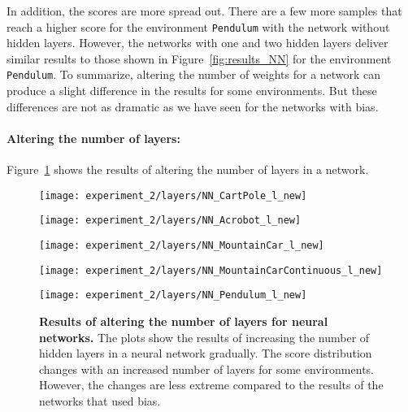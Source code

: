In addition, the scores are more spread out. There are a few more samples that reach a higher score for the environment \verb|Pendulum| with the network without hidden layers. However, the networks with one and two hidden layers deliver similar results to those shown in Figure~\ref{fig:results_NN} for the environment \verb|Pendulum|. To summarize, altering the number of weights for a network can produce a slight difference in the results for some environments. But these differences are not as dramatic as we have seen for the networks with bias.

\paragraph*{Altering the number of layers:} Figure~\ref{fig:experiment_2_layers} shows the results of altering the number of layers in a network.
\begin{figure}
  \centering
\texttt{[image: experiment\_2/layers/NN\_CartPole\_l\_new]}

  \vspace{0.2cm}

\texttt{[image: experiment\_2/layers/NN\_Acrobot\_l\_new]}

  \vspace{0.2cm}

\texttt{[image: experiment\_2/layers/NN\_MountainCar\_l\_new]}

  \vspace{0.2cm}

\texttt{[image: experiment\_2/layers/NN\_MountainCarContinuous\_l\_new]}

  \vspace{0.2cm}

\texttt{[image: experiment\_2/layers/NN\_Pendulum\_l\_new]}
\caption[Results of altering the number of layers for neural networks]{
  \textbf{Results of altering the number of layers for neural networks.}
   The plots show the results of increasing the number of hidden layers in a neural network gradually. The score distribution changes with an increased number of layers for some environments. However, the changes are less extreme compared to the results of the networks that used bias.
}
\label{fig:experiment_2_layers}
\end{figure}
